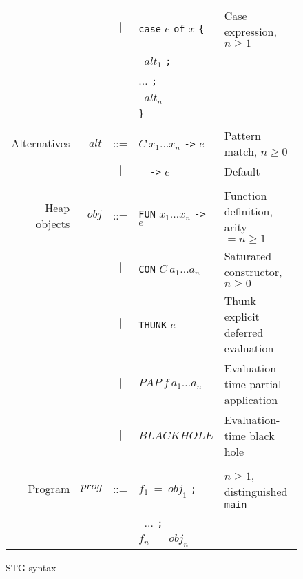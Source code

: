 \documentclass{llncs}
\begin{document}
\begin{figure}
\begin{centering}
\begin{tabular}{r r c l l}
             &                & $|$ & \texttt{case} $e$ \texttt{of} $x$ \texttt{\{}  & Case expression, $n \ge 1$\\
             &                &     & \texttt{ } $\mathit{alt}_1$ \texttt{;} \\
             &                &     & \hspace{0.2in} $\dots$ \texttt{;} \\
             &                &     & \texttt{ } $\mathit{alt}_n$ \\
             &                &     & \texttt{\}} \\
\\
Alternatives & $\mathit{alt}$ & ::= & $C\ x_1\dots x_n$ \texttt{->} $e$            & Pattern match, $n \ge 0$ \\
             &                & $|$ & \texttt{\_ ->} $e$                           & Default \\
\\
Heap objects & $\mathit{obj}$ & ::= &\texttt{FUN} $x_1\dots x_n$ \texttt{->} $e$   & Function definition, arity $=n\ge 1$ \\
             &                & $|$ &\texttt{CON} $C\ a_1\dots a_n$                & Saturated constructor, $n \ge 0$ \\
             &                & $|$ &\texttt{THUNK} $e$                            & Thunk---explicit deferred evaluation \\
             &                & $|$ & $\mathit{PAP}\ f\ a_1\dots a_n$               & Evaluation-time partial application \\
             &                & $|$ & $\mathit{BLACKHOLE}$                         & Evaluation-time black hole \\
\\
Program      & $\mathit{prog}$& ::= & $f_1\ =\ \mathit{obj}_1$ \texttt{;}          & $n \ge 1$, distinguished \texttt{main}\\
             &                &     & \texttt{ } $\dots$ \texttt{;} \\
             &                &     & $f_n\ =\ \mathit{obj}_n$

\end{tabular}
\end{centering}
\caption{STG syntax}
\label{fig:STGsyntax}
\end{figure}
\end{document}
